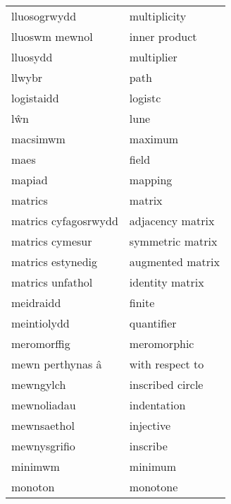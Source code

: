 \begin{supertabular}{p{0.22\textwidth}p{0.22\textwidth}}
                   lluosogrwydd &                     multiplicity \\
                 lluoswm mewnol &                    inner product \\
                       lluosydd &                       multiplier \\
                         llwybr &                             path \\
                     logistaidd &                          logistc \\
                            lŵn &                             lune \\
                       macsimwm &                          maximum \\
                           maes &                            field \\
                         mapiad &                          mapping \\
                        matrics &                           matrix \\
           matrics cyfagosrwydd &                 adjacency matrix \\
                matrics cymesur &                 symmetric matrix \\
              matrics estynedig &                 augmented matrix \\
               matrics unfathol &                  identity matrix \\
                      meidraidd &                           finite \\
                    meintiolydd &                       quantifier \\
                    meromorffig &                      meromorphic \\
               mewn perthynas â &                  with respect to \\
                      mewngylch &                 inscribed circle \\
                    mewnoliadau &                      indentation \\
                    mewnsaethol &                        injective \\
                   mewnysgrifio &                         inscribe \\
                        minimwm &                          minimum \\
                        monoton &                         monotone \\

\end{supertabular}
